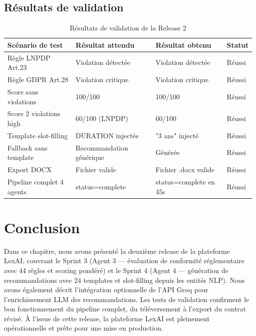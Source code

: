 \subsection{Résultats de validation}

\begin{table}[H]
\centering
\renewcommand{\arraystretch}{1.4}
\begin{tabular}{|p{5cm}|p{3cm}|p{3cm}|p{3cm}|}
\hline
\textbf{Scénario de test} & \textbf{Résultat attendu} & \textbf{Résultat obtenu} & \textbf{Statut} \\
\hline
Règle LNPDP Art.23 & Violation détectée & Violation détectée & Réussi \\
\hline
Règle GDPR Art.28 & Violation critique & Violation critique & Réussi \\
\hline
Score sans violations & 100/100 & 100/100 & Réussi \\
\hline
Score 2 violations high & 60/100 (LNPDP) & 60/100 & Réussi \\
\hline
Template slot-filling & DURATION injectée & "3 ans" injecté & Réussi \\
\hline
Fallback sans template & Recommandation générique & Générée & Réussi \\
\hline
Export DOCX & Fichier valide & Fichier .docx valide & Réussi \\
\hline
Pipeline complet 4 agents & status=complete & status=complete en 45s & Réussi \\
\hline
\end{tabular}
\caption{Résultats de validation de la Release 2}
\label{tab:tests_r2}
\end{table}

\section{Conclusion}

Dans ce chapitre, nous avons présenté la deuxième release de la plateforme LexAI, couvrant le Sprint 3 (Agent 3 — évaluation de conformité réglementaire avec 44 règles et scoring pondéré) et le Sprint 4 (Agent 4 — génération de recommandations avec 24 templates et slot-filling depuis les entités NLP). Nous avons également décrit l'intégration optionnelle de l'API Groq pour l'enrichissement LLM des recommandations. Les tests de validation confirment le bon fonctionnement du pipeline complet, du téléversement à l'export du contrat révisé. À l'issue de cette release, la plateforme LexAI est pleinement opérationnelle et prête pour une mise en production.
